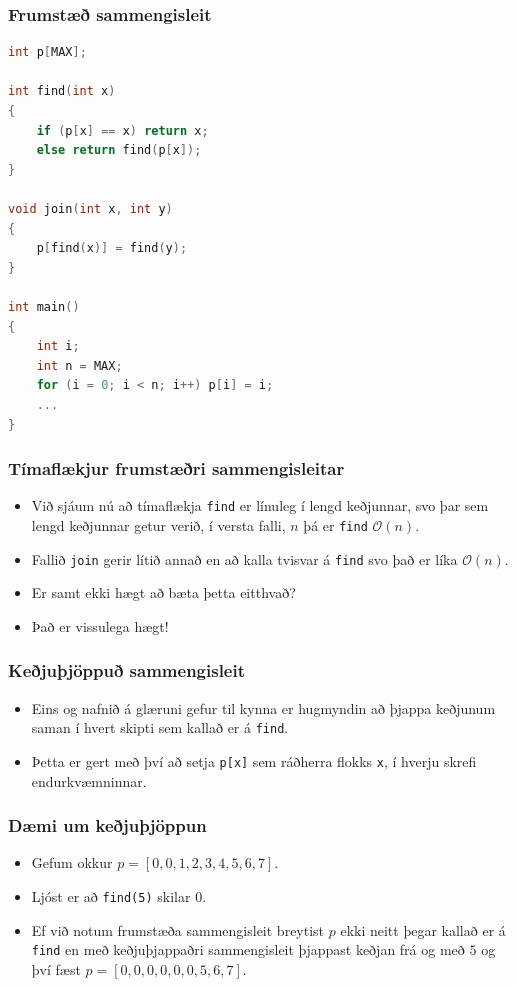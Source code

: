 \documentclass{beamer}
\begin{document}
\begin{frame}[fragile]
	\frametitle{Frumstæð sammengisleit}
\tiny
\begin{lstlisting}[language=C++]
int p[MAX];

int find(int x)
{
	if (p[x] == x) return x;
	else return find(p[x]);
}

void join(int x, int y)
{
	p[find(x)] = find(y);
}

int main()
{
	int i;
	int n = MAX;
	for (i = 0; i < n; i++) p[i] = i;
	...
}
\end{lstlisting}
\end{frame}

\begin{frame}
\frametitle{Tímaflækjur frumstæðri sammengisleitar}
\begin{itemize}
	\item<1-> Við sjáum nú að tímaflækja \texttt{find} er línuleg í lengd keðjunnar, svo 
		þar sem lengd keðjunnar getur verið, í versta falli, $n$ þá er \texttt{find} $\mathcal{O}(n)$.
	\item<2-> Fallið \texttt{join} gerir lítið annað en að kalla tvisvar á \texttt{find} svo það er líka
		$\mathcal{O}(n)$.
	\item<3-> Er samt ekki hægt að bæta þetta eitthvað?
	\item<4-> Það er vissulega hægt!
\end{itemize}
\end{frame}

\begin{frame}
\frametitle{Keðjuþjöppuð sammengisleit}
\begin{itemize}
	\item<1-> Eins og nafnið á glæruni gefur til kynna er hugmyndin að þjappa keðjunum saman í hvert skipti sem kallað er á
		\texttt{find}.
	\item<2-> Þetta er gert með því að setja \texttt{p[x]} sem ráðherra flokks \texttt{x}, í hverju skrefi endurkvæmninnar.
\end{itemize}
\end{frame}

\begin{frame}
\frametitle{Dæmi um keðjuþjöppun}
\begin{itemize}
	\item<1-> Gefum okkur
		$p = [0, 0, 1, 2, 3, 4, 5, 6, 7]$.
	\item<2-> Ljóst er að \texttt{find(5)} skilar $0$.
	\item<3-> Ef við notum frumstæða sammengisleit breytist $p$ ekki neitt þegar kallað er á \texttt{find}
		en með keðjuþjappaðri sammengisleit þjappast keðjan frá og með $5$ og því fæst
		$p = [0, 0, 0, 0, 0, 0, 5, 6, 7]$.
\end{itemize}
\end{frame}
\end{document}

